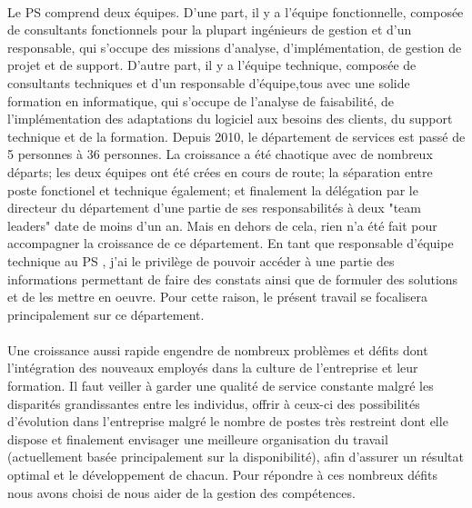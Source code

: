 \paragraph{}Le PS comprend deux équipes. D'une part, il y a l'équipe fonctionnelle, composée de consultants fonctionnels pour la plupart ingénieurs de gestion et d'un responsable, qui s'occupe des missions d'analyse, d'implémentation, de gestion de projet et de support. D'autre part, il y a l'équipe technique, composée de consultants techniques et d'un responsable d'équipe,tous avec une solide formation en informatique, qui s'occupe de l'analyse de faisabilité, de l'implémentation des adaptations du logiciel aux besoins des clients, du support technique et de la formation. Depuis 2010, le département de services est passé de 5 personnes à 36 personnes. La croissance a été chaotique avec de nombreux départs; les deux équipes ont été crées en cours de route; la séparation entre poste fonctionel et technique également; et finalement la délégation par le directeur du département d'une partie de ses responsabilités à deux "team leaders" date de moins d'un an. Mais en dehors de cela, rien n'a été fait pour accompagner la croissance de ce département. En tant que responsable d’équipe technique au PS , j’ai le privilège de pouvoir accéder à une partie des informations permettant de faire des constats ainsi que de formuler des solutions et de les mettre en oeuvre. Pour cette raison, le présent travail se focalisera principalement sur ce département.


\paragraph*{}Une croissance aussi rapide engendre de nombreux problèmes et défits dont l'intégration des nouveaux employés dans la culture de l'entreprise et leur formation. Il faut veiller à garder une qualité de service constante malgré les disparités grandissantes entre les individus, offrir à ceux-ci des possibilités d'évolution dans l'entreprise malgré le nombre de postes très restreint dont elle dispose et finalement envisager une meilleure organisation du travail (actuellement basée principalement sur la disponibilité), afin d'assurer un résultat optimal et le développement de chacun. Pour répondre à ces nombreux défits nous avons choisi de nous aider de la gestion des compétences.

